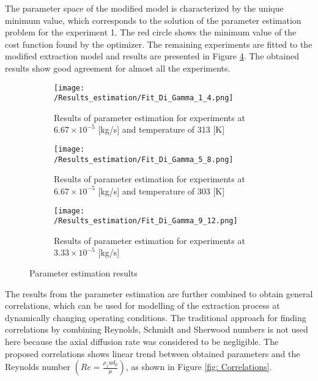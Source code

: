 \documentclass[../Supercritical_fluid_extraction_of_essential_oil_from_chamomile.tex]{subfiles}
\begin{document}
	The parameter space of the modified model is characterized by the unique minimum value, which corresponds to the solution of the parameter estimation problem for the experiment 1. The red circle shows the minimum value of the cost function found by the optimizer. The remaining experiments are fitted to the modified extraction model and results are presented in Figure \ref{fig: Fit_Di_Gamma}. The obtained results show good agreement for almost all the experiments. 

	\begin{figure}
		\centering
		\begin{subfigure}[b]{\columnwidth}
			\centering
			\texttt{[image: /Results\_estimation/Fit\_Di\_Gamma\_1\_4.png]}
			\caption{Results of parameter estimation for experiments at $6.67\times 10^{-5}$ [kg/s] and temperature of 313 [K]}
			\label{fig: Fit_1_4_Di_Gamma}
		\end{subfigure}
		\hfill
		\begin{subfigure}[b]{\columnwidth}
			\centering
			\texttt{[image: /Results\_estimation/Fit\_Di\_Gamma\_5\_8.png]}
			\caption{Results of parameter estimation for experiments at $6.67\times 10^{-5}$ [kg/s] and temperature of 303 [K]}
			\label{fig: Fit_5_8_Di_Gamma}
		\end{subfigure}
		\hfil
		\begin{subfigure}[b]{\columnwidth}
			\centering
			\texttt{[image: /Results\_estimation/Fit\_Di\_Gamma\_9\_12.png]}
			\caption{Results of parameter estimation for experiments at $3.33\times 10^{-5}$ [kg/s]}
			\label{fig: Fit_9_12_Di_Gamma}
		\end{subfigure}
		\caption{Parameter estimation results}
		\label{fig: Fit_Di_Gamma}
	\end{figure}
		
	The results from the parameter estimation are further combined to obtain general correlations, which can be used for modelling of the extraction process at dynamically changing operating conditions. The traditional approach for finding correlations by combining Reynolds, Schmidt and Sherwood numbers is not used here because the axial diffusion rate was considered to be negligible. The proposed correlations shows linear trend between obtained parameters and the Reynolds number $\left(Re = \frac{\rho_f u d_p}{\mu}\right)$, as shown in Figure \ref{fig: Correlations}.
	
\end{document}
